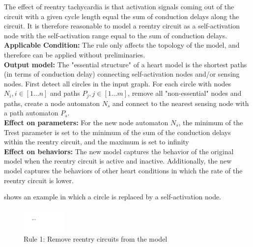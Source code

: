 The effect of reentry tachycardia is that activation signals coming out of the circuit with a given cycle length equal the sum of conduction delays along the circuit.
It is therefore reasonable to model a reentry circuit as a self-activation node with the self-activation range equal to the sum of conduction delays. \\
\textbf{Applicable Condition: } The rule only affects the topology of the model, and therefore can be applied without preliminaries.\\
\textbf{Output model: }The "essential structure" of a heart model is the shortest paths (in terms of conduction delay) connecting self-activation nodes and/or sensing nodes. 
First detect all circles in the input graph. For each circle with nodes $N_i,i\in[1\dots n]$ and paths $P_j,j\in[1\dots m]$, remove all "non-essential" nodes and paths, create a node automaton $N_s$ and connect to the nearest sensing node with a path automaton $P_s$.\\
\textbf{Effect on parameters: }For the new node automaton $N_s$, the minimum of the Trest parameter is set to the minimum of the sum of the conduction delays within the reentry circuit, and the maximum is set to infinity\\
\textbf{Effect on behaviors: }The new model captures the behavior of the original model when the reentry circuit is active and inactive. Additionally, the new model captures the behaviors of other heart conditions in which the rate of the reentry circuit is lower.

 shows an example in which a circle is replaced by a self-activation node.
\begin{figure}[!h]
	\centering
	\includegraphics[width=0.2\textwidth]{figs/rule1.pdf}
	\vspace{-10pt}
	\caption{\small Rule 1: Remove reentry circuits from the model}
	\vspace{-10pt}
	\label{fig:rule1}
\end{figure}
